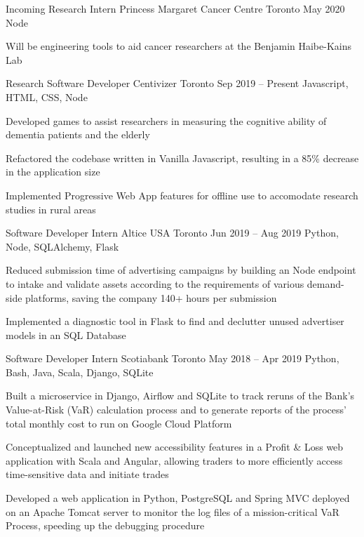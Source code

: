 \begin{cventries}
  \cventry
    {Incoming Research Intern}
    {Princess Margaret Cancer Centre}
    {Toronto}
    {May 2020}
    {Node}
    {
      \begin{cvitems}
        \item {Will be engineering tools to aid cancer researchers at the Benjamin Haibe-Kains Lab}
      \end{cvitems}
    }
  \cventry
    {Research Software Developer}
    {Centivizer}
    {Toronto}
    {Sep 2019 -- Present}
    {Javascript, HTML, CSS, Node}
    {
      \begin{cvitems}
        \item {Developed games to assist researchers in measuring the cognitive ability of dementia patients and the elderly}
        \item {Refactored the codebase written in Vanilla Javascript, resulting in a 85\% decrease in the application size}
        \item {Implemented Progressive Web App features for offline use to accomodate research studies in rural areas}
      \end{cvitems}
    }
  \cventry
    {Software Developer Intern}
    {Altice USA}
    {Toronto}
    {Jun 2019 -- Aug 2019}
    {Python, Node, SQLAlchemy, Flask}
    {
    \begin{cvitems}
      \item {Reduced submission time of advertising campaigns by building an Node endpoint to intake and validate assets according to the requirements of various demand-side platforms, saving the company 140+ hours per submission}
      \item {Implemented a diagnostic tool in Flask to find and declutter unused advertiser models in an SQL Database}
    \end{cvitems}
    }
  \cventry
    {Software Developer Intern}
    {Scotiabank}
    {Toronto}
    {May 2018 -- Apr 2019}
    {Python, Bash, Java, Scala, Django, SQLite}
    {
      \begin{cvitems}
        \item {Built a microservice in Django, Airflow and SQLite to track reruns of the Bank's Value-at-Risk (VaR) calculation process and to generate reports of the process' total monthly cost to run on Google Cloud Platform}
        \item {Conceptualized and launched new accessibility features in a Profit \& Loss web application with Scala and Angular, allowing traders to more efficiently access time-sensitive data and initiate trades}
        \item {Developed a web application in Python, PostgreSQL and Spring MVC deployed on an Apache Tomcat server to monitor the log files of a mission-critical VaR Process, speeding up the debugging procedure}
      \end{cvitems}
    }


\end{cventries}
